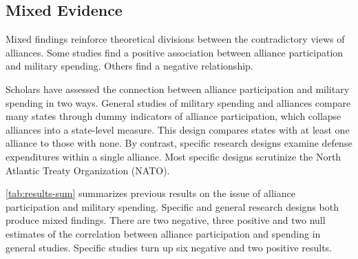 \documentclass[12pt]{article}
\begin{document}
\subsection{Mixed Evidence} 


Mixed findings reinforce theoretical divisions between the contradictory views of alliances.
Some studies find a positive association between alliance participation and military spending. 
Others find a negative relationship.


Scholars have assessed the connection between alliance participation and military spending in two ways. 
General studies of military spending and alliances compare many states through dummy indicators of alliance participation, which collapse alliances into a state-level measure. 
This design compares states with at least one alliance to those with none.
By contrast, specific research designs examine defense expenditures within a single alliance. 
Most specific designs scrutinize the North Atlantic Treaty Organization (NATO).


\autoref{tab:results-sum} summarizes previous results on the issue of alliance participation and military spending. 
Specific and general research designs both produce mixed findings. 
There are two negative, three positive and two null estimates of the correlation between alliance participation and spending in general studies. 
Specific studies turn up six negative and two positive results.  
\end{document}
